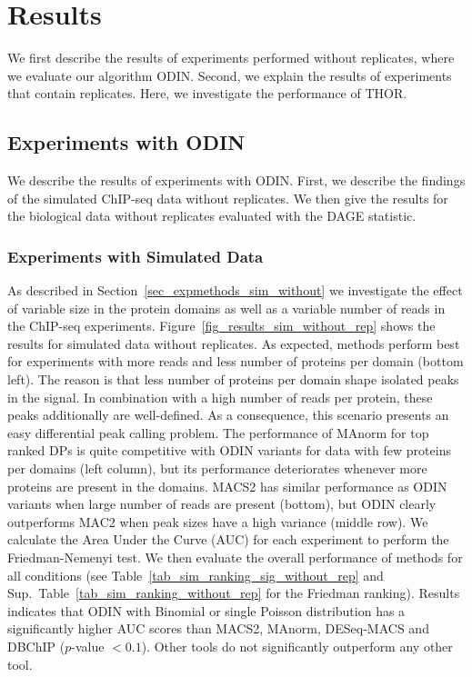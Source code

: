 \chapter{Results}
\label{chapter_results}
We first describe the results of experiments performed without replicates, where we evaluate our algorithm ODIN.
Second, we explain the results of experiments that contain replicates.
Here, we investigate the performance of THOR.

\section{Experiments with ODIN}
We describe the results of experiments with ODIN.
First, we describe the findings of the simulated ChIP-seq data without replicates.
We then give the results for the biological data without replicates evaluated with the DAGE statistic.

\subsection{Experiments with Simulated Data}
As described in Section~\ref{sec_expmethods_sim_without} we investigate the effect of variable size in the protein domains as well as a variable number of reads in the ChIP-seq experiments.
Figure~\ref{fig_results_sim_without_rep} shows the results for simulated data without replicates. 
As expected, methods perform best for experiments with more reads and less number of proteins per domain (bottom left). 
The reason is that less number of proteins per domain shape isolated peaks in the signal.
In combination with a high number of reads per protein, these peaks additionally are well-defined.
As a consequence, this scenario presents an easy differential peak calling problem.
The performance of MAnorm for top ranked DPs is quite competitive with ODIN variants for data with few proteins per domains (left column), but its performance deteriorates whenever more proteins are present in the domains. 
MACS2 has similar performance as ODIN variants when large number of reads are present (bottom), but ODIN clearly outperforms MAC2 when peak sizes have a high variance (middle row). 
We calculate the Area Under the Curve (AUC) for each experiment to perform the Friedman-Nemenyi test.
We then evaluate the overall performance of methods for all conditions (see Table~\ref{tab_sim_ranking_sig_without_rep} and Sup.~Table~\ref{tab_sim_ranking_without_rep} for the Friedman ranking). 
Results indicates that ODIN with  Binomial or single Poisson distribution has a significantly higher AUC scores than MACS2, MAnorm, DESeq-MACS and DBChIP ($p$-value $< 0.1$).
Other tools do not significantly outperform any other tool.

